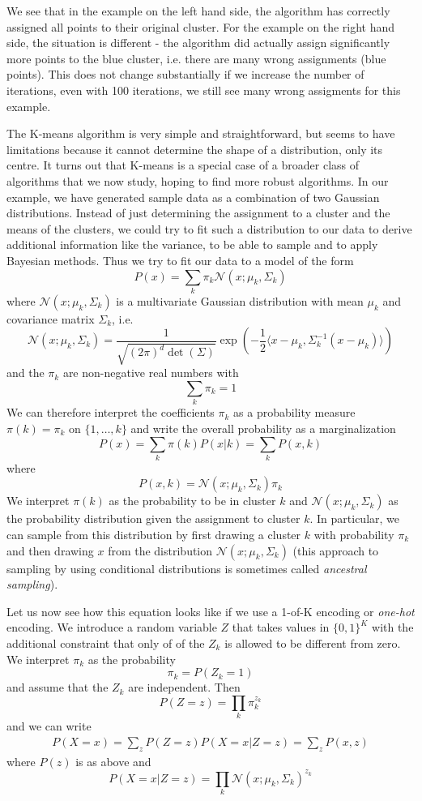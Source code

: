 \documentclass[a4paper, draft]{article}
\theoremstyle{own}
\theoremstyle{remark}
\begin{document}
We see that in the example on the left hand side, the algorithm has correctly assigned all points to their original cluster. For the example on the right hand side, the situation is different - the algorithm did actually assign significantly more points to the blue cluster, i.e. there are many wrong assignments (blue points). This does not change substantially if we increase the number of iterations, even with 100 iterations, we still see many wrong assigments for this example.

The K-means algorithm is very simple and straightforward, but seems to have limitations because it cannot determine the shape of a distribution, only its centre. It turns out that K-means is a special case of a broader class of algorithms that we now study, hoping to find more robust algorithms. In our example, we have generated sample data as a combination of two Gaussian distributions. Instead of just determining the assignment to a cluster and the means of the clusters, we could try to fit such a distribution to our data to derive additional information like the variance, to be able to sample and to apply Bayesian methods. Thus we try to fit our data to a model of the form
$$
P(x) = \sum_k \pi_k {\mathcal N}(x ; \mu_k, \Sigma_k)
$$
where ${\mathcal N}(x ; \mu_k, \Sigma_k)$ is a multivariate Gaussian distribution
with mean $\mu_k$ and covariance matrix $\Sigma_k$, i.e.
$$
{\mathcal N}(x ; \mu_k, \Sigma_k) = \frac{1}{\sqrt{(2\pi)^d \det(\Sigma)}}
\exp (-\frac{1}{2} \langle x - \mu_k, \Sigma_k^{-1}(x - \mu_k)\rangle)
$$
and the $\pi_k$ are non-negative real numbers with 
$$
\sum_k \pi_k = 1
$$
We can therefore interpret the coefficients $\pi_k$ as a probability measure $\pi(k) = \pi_k$ on $\{1, \dots, k\}$ and write the overall probability as a marginalization
$$
P(x) = \sum_k \pi(k) P(x | k) = \sum_k P(x,k)
$$
where 
$$
P(x , k) = {\mathcal N}(x ; \mu_k, \Sigma_k) \pi_k
$$
We interpret $\pi(k)$ as the probability to be in cluster $k$ and ${\mathcal N}(x ; \mu_k, \Sigma_k)$ as the probability distribution given the assignment to cluster $k$. In particular, we can sample from this distribution by first drawing a cluster $k$ with probability $\pi_k$ and then drawing $x$ from the distribution ${\mathcal N}(x ; \mu_k, \Sigma_k)$ (this approach to sampling by using conditional distributions is sometimes called {\em ancestral sampling}).

Let us now see how this equation looks like if we use a 1-of-K encoding or {\em one-hot} encoding. We introduce a random variable $Z$ that takes values in $\{ 0, 1\}^K$ with the additional constraint that only of of the $Z_k$ is allowed to be different from zero. We interpret $\pi_k$ as the probability 
$$
\pi_k = P(Z_k = 1)
$$
and assume that the $Z_k$ are independent. Then
$$
P(Z = z) = \prod_k \pi_k ^{z_k}
$$
and we can write
\begin{align}\label{eq:latentmodeljointdistribution}
P(X=x) = \sum_z P(Z=z) P(X=x | Z=z) = \sum_z P(x,z)
\end{align}
where $P(z)$ is as above and
$$
P(X = x | Z = z) = \prod_k {\mathcal N}(x ; \mu_k, \Sigma_k)^{z_k}
$$
\end{document}
